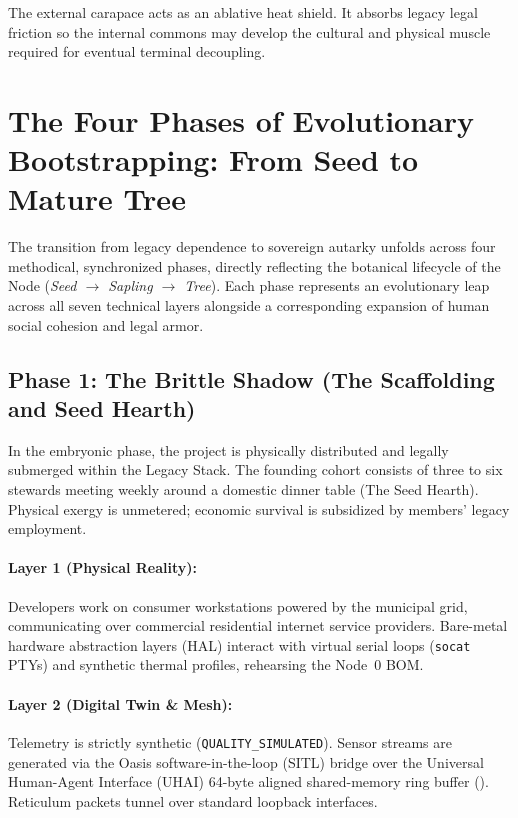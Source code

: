 The external carapace acts as an ablative heat shield. It absorbs legacy legal friction so the internal commons may develop the cultural and physical muscle required for eventual terminal decoupling.

\section{The Four Phases of Evolutionary Bootstrapping: From Seed to Mature Tree}
\label{sec:bootstrapping_phases}

The transition from legacy dependence to sovereign autarky unfolds across four methodical, synchronized phases, directly reflecting the botanical lifecycle of the Node (\textit{Seed $\to$ Sapling $\to$ Tree}). Each phase represents an evolutionary leap across all seven technical layers alongside a corresponding expansion of human social cohesion and legal armor.

\subsection{Phase 1: The Brittle Shadow (The Scaffolding and Seed Hearth)}
\label{subsec:phase1_shadow}

In the embryonic phase, the project is physically distributed and legally submerged within the Legacy Stack. The founding cohort consists of three to six stewards meeting weekly around a domestic dinner table (The Seed Hearth). Physical exergy is unmetered; economic survival is subsidized by members' legacy employment.

\paragraph{Layer 1 (Physical Reality):} Developers work on consumer workstations powered by the municipal grid, communicating over commercial residential internet service providers. Bare-metal hardware abstraction layers (HAL) interact with virtual serial loops (\texttt{socat} PTYs) and synthetic thermal profiles, rehearsing the Node~0 BOM.
\paragraph{Layer 2 (Digital Twin \& Mesh):} Telemetry is strictly synthetic (\texttt{QUALITY\_SIMULATED}). Sensor streams are generated via the Oasis software-in-the-loop (SITL) bridge over the Universal Human-Agent Interface (UHAI) 64-byte aligned shared-memory ring buffer (). Reticulum packets tunnel over standard loopback interfaces.
